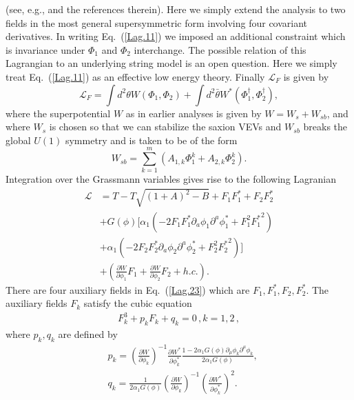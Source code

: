 \documentclass[12pt]{article}
\begin{document}
(see, e.g., \cite{Rocek:1997hi,Tseytlin:1999dj,Sasaki:2012ka} and the references
therein). Here we simply extend the analysis to two fields
in the most general supersymmetric form involving four covariant derivatives. In writing Eq.~(\ref{Lag.11}) we imposed
an additional constraint which is invariance under $\Phi_1$ and $\Phi_2$ interchange.
The possible relation of this Lagrangian
to an underlying string model is an open question. Here we simply treat Eq.~(\ref{Lag.11}) as an effective low energy
theory. Finally $\mathcal{L}_{F}$ is given by
\begin{equation}
  \mathcal{L}_{F}=\int d^2\theta W\left(\Phi_1,\Phi_2\right)+\int d^2\bar\theta
  W^* \left(\Phi_1^\dagger,\Phi_2^\dagger\right),
\end{equation}
where the superpotential $W$ as in earlier analyses is given by $W=W_s+W_{sb}$, and where
$W_s$ is chosen so that we can stabilize the saxion VEVs
and $W_{sb}$ breaks the global $U(1)$ symmetry and is taken to be of the form
\begin{equation}
  W_{sb}=\sum_{k=1}^m\left(A_{1, k}\Phi_1^k+A_{2, k}\Phi_2^k\right).
  \label{w3}
\end{equation}
Integration over the Grassmann variables gives rise to the following Lagranian\\
\begin{align}
  \mathcal{L}
   & =
  T - T \sqrt{(1+A)^2 - B}+ F_1 F^*_1 + F_2 F^*_2\nonumber\\
   & + G(\phi) \Big[ \alpha_1(-2 F_1 F^*_1 \partial_a\phi_1 \partial^a \phi^*_1
    + F_1^2 {F^*_1}^2)\nonumber\\
   & + \alpha_1 (-2 F_2 F^*_2 \partial_a\phi_2 \partial^a \phi^*_2
    + F_2^2 {F^*_2}^2)\Big]
  \nonumber\\
   & + \left(\frac{\partial W}{\partial \phi_1}F_1+ \frac{\partial W}{\partial \phi_2}F_2 + h.c.\right).
  \label{Lag.23}
\end{align}
There are four auxiliary fields in Eq.~(\ref{Lag.23}) which are $F_1, F^*_1, F_2, F^*_2$.
The auxiliary fields $F_k$ satisfy the cubic equation
\begin{align}
  F_k^3+ p_k F_k + q_k=0\,, k=1,2\,,
\end{align}
where $p_k, q_k$ are defined by
\begin{equation}\label{DisplayFormulaNumbered:eq.twoDBI.p.1}
  \begin{split}
    & p_k={\left(\frac{\partial W}{\partial \phi_k}\right)}^{-1}\frac{\partial W^*}{\partial \phi^*_k}\frac{1-2\alpha_1 G\left(\phi\right)\partial_\mu \phi_k\partial^\mu \phi_k}{2\alpha_1 G\left(\phi\right)}, \\
    & q_k=\frac{1}{2\alpha_1 G\left(\phi\right)}{\left(\frac{\partial W}{\partial \phi_k}\right)}^{-1}{\left(\frac{\partial W^*}{\partial \phi^*_k}\right)}^2. \\
  \end{split}
\end{equation}
\end{document}
